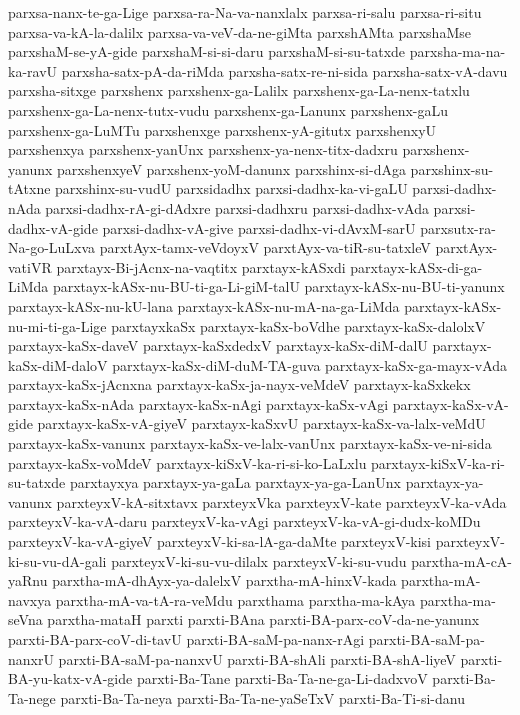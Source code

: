 {parxsa-nanx-te-ga-Lige
parxsa-ra-Na-va-nanxlalx
parxsa-ri-salu
parxsa-ri-situ
parxsa-va-kA-la-dalilx
parxsa-va-veV-da-ne-giMta
parxshAMta
parxshaMse
parxshaM-se-yA-gide
parxshaM-si-si-daru
parxshaM-si-su-tatxde
parxsha-ma-na-ka-ravU
parxsha-satx-pA-da-riMda
parxsha-satx-re-ni-sida
parxsha-satx-vA-davu
parxsha-sitxge
parxshenx
parxshenx-ga-Lalilx
parxshenx-ga-La-nenx-tatxlu
parxshenx-ga-La-nenx-tutx-vudu
parxshenx-ga-Lanunx
parxshenx-gaLu
parxshenx-ga-LuMTu
parxshenxge
parxshenx-yA-gitutx
parxshenxyU
parxshenxya
parxshenx-yanUnx
parxshenx-ya-nenx-titx-dadxru
parxshenx-yanunx
parxshenxyeV
parxshenx-yoM-danunx
parxshinx-si-dAga
parxshinx-su-tAtxne
parxshinx-su-vudU
parxsidadhx
parxsi-dadhx-ka-vi-gaLU
parxsi-dadhx-nAda
parxsi-dadhx-rA-gi-dAdxre
parxsi-dadhxru
parxsi-dadhx-vAda
parxsi-dadhx-vA-gide
parxsi-dadhx-vA-give
parxsi-dadhx-vi-dAvxM-sarU
parxsutx-ra-Na-go-LuLxva
parxtAyx-tamx-veVdoyxV
parxtAyx-va-tiR-su-tatxleV
parxtAyx-vatiVR
parxtayx-Bi-jAcnx-na-vaqtitx
parxtayx-kASxdi
parxtayx-kASx-di-ga-LiMda
parxtayx-kASx-nu-BU-ti-ga-Li-giM-talU
parxtayx-kASx-nu-BU-ti-yanunx
parxtayx-kASx-nu-kU-lana
parxtayx-kASx-nu-mA-na-ga-LiMda
parxtayx-kASx-nu-mi-ti-ga-Lige
parxtayxkaSx
parxtayx-kaSx-boVdhe
parxtayx-kaSx-dalolxV
parxtayx-kaSx-daveV
parxtayx-kaSxdedxV
parxtayx-kaSx-diM-dalU
parxtayx-kaSx-diM-daloV
parxtayx-kaSx-diM-duM-TA-guva
parxtayx-kaSx-ga-mayx-vAda
parxtayx-kaSx-jAcnxna
parxtayx-kaSx-ja-nayx-veMdeV
parxtayx-kaSxkekx
parxtayx-kaSx-nAda
parxtayx-kaSx-nAgi
parxtayx-kaSx-vAgi
parxtayx-kaSx-vA-gide
parxtayx-kaSx-vA-giyeV
parxtayx-kaSxvU
parxtayx-kaSx-va-lalx-veMdU
parxtayx-kaSx-vanunx
parxtayx-kaSx-ve-lalx-vanUnx
parxtayx-kaSx-ve-ni-sida
parxtayx-kaSx-voMdeV
parxtayx-kiSxV-ka-ri-si-ko-LaLxlu
parxtayx-kiSxV-ka-ri-su-tatxde
parxtayxya
parxtayx-ya-gaLa
parxtayx-ya-ga-LanUnx
parxtayx-ya-vanunx
parxteyxV-kA-sitxtavx
parxteyxVka
parxteyxV-kate
parxteyxV-ka-vAda
parxteyxV-ka-vA-daru
parxteyxV-ka-vAgi
parxteyxV-ka-vA-gi-dudx-koMDu
parxteyxV-ka-vA-giyeV
parxteyxV-ki-sa-lA-ga-daMte
parxteyxV-kisi
parxteyxV-ki-su-vu-dA-gali
parxteyxV-ki-su-vu-dilalx
parxteyxV-ki-su-vudu
parxtha-mA-cA-yaRnu
parxtha-mA-dhAyx-ya-dalelxV
parxtha-mA-hinxV-kada
parxtha-mA-navxya
parxtha-mA-va-tA-ra-veMdu
parxthama
parxtha-ma-kAya
parxtha-ma-seVna
parxtha-mataH
parxti
parxti-BAna
parxti-BA-parx-coV-da-ne-yanunx
parxti-BA-parx-coV-di-tavU
parxti-BA-saM-pa-nanx-rAgi
parxti-BA-saM-pa-nanxrU
parxti-BA-saM-pa-nanxvU
parxti-BA-shAli
parxti-BA-shA-liyeV
parxti-BA-yu-katx-vA-gide
parxti-Ba-Tane
parxti-Ba-Ta-ne-ga-Li-dadxvoV
parxti-Ba-Ta-nege
parxti-Ba-Ta-neya
parxti-Ba-Ta-ne-yaSeTxV
parxti-Ba-Ti-si-danu
}
